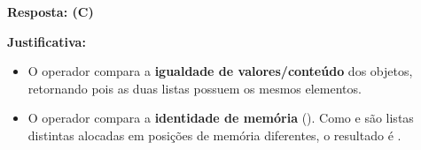 \ifmostrarGabarito
\textbf{Resposta: (C)}

\textbf{Justificativa:}
\begin{itemize}
    \item O operador \code{==} compara a \textbf{igualdade de valores/conteúdo} dos objetos, retornando  pois as duas listas possuem os mesmos elementos.
    \item O operador  compara a \textbf{identidade de memória} (). Como  e  são listas distintas alocadas em posições de memória diferentes, o resultado é .
\end{itemize}

\fi
